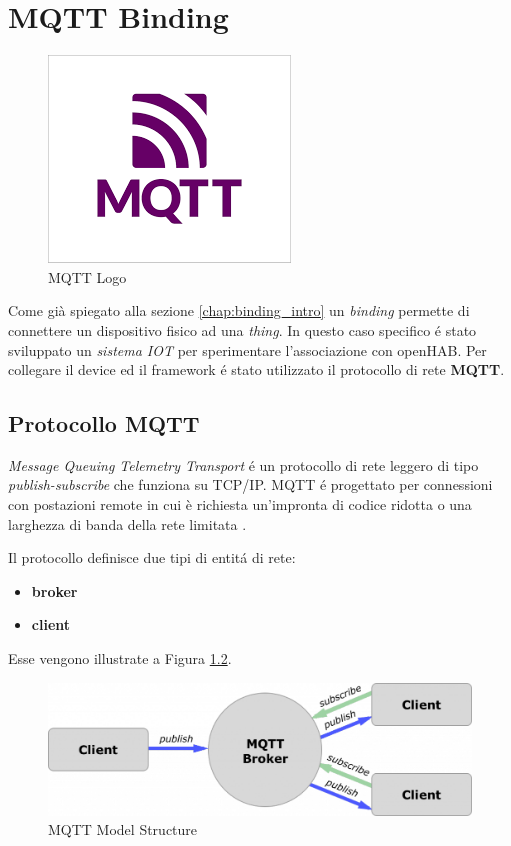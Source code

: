 \chapter{MQTT Binding}
\begin{figure}
    \centering
    \includegraphics{Immagini/mqtt_logo.png}
    \caption{MQTT Logo}
    \label{fig:mqtt_logo}
\end{figure}

Come già spiegato alla sezione \ref{chap:binding_intro} un {\em binding} permette di connettere un dispositivo fisico ad una {\em thing}. In questo caso specifico \'e stato sviluppato un {\em sistema IOT} per sperimentare l'associazione con openHAB. Per collegare il device ed il framework \'e stato utilizzato il protocollo di rete \textbf{MQTT}.

\section{Protocollo MQTT}
{\em Message Queuing Telemetry Transport} \'e un protocollo di rete leggero di tipo {\em  publish-subscribe} che funziona su TCP/IP. MQTT \'e progettato per connessioni con postazioni remote in cui è richiesta un'impronta di codice ridotta o una larghezza di banda della rete limitata \cite{enwiki:1023769301}.

Il protocollo definisce due tipi di entit\'a di rete:
\begin{itemize}
    \item \textbf{broker}
    \item \textbf{client}
\end{itemize}
Esse vengono illustrate a Figura \ref{fig:mqtt_model_structure}.

\begin{figure}
    \centering
    \includegraphics[width=12cm]{Immagini/mqtt_model_structure.png}
    \caption{MQTT Model Structure}
    \label{fig:mqtt_model_structure}
\end{figure}

